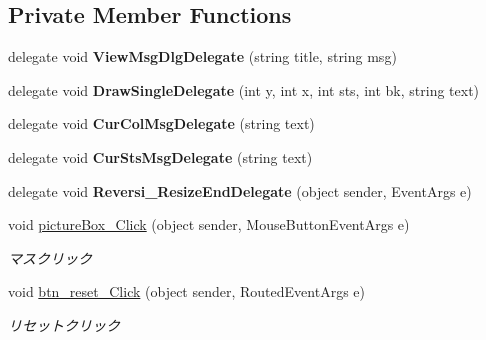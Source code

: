 \subsection*{Private Member Functions}
\begin{DoxyCompactItemize}
\item 
\mbox{\label{class_reversi4color_wpf_1_1_main_window_af7a6383c09300a4e2171b6eea4e21612}} 
delegate void {\bfseries View\+Msg\+Dlg\+Delegate} (string title, string msg)
\item 
\mbox{\label{class_reversi4color_wpf_1_1_main_window_ad205bd924bfb935dea867930734f6df7}} 
delegate void {\bfseries Draw\+Single\+Delegate} (int y, int x, int sts, int bk, string text)
\item 
\mbox{\label{class_reversi4color_wpf_1_1_main_window_a5733a1e142e99fd7fbf2697fb391501e}} 
delegate void {\bfseries Cur\+Col\+Msg\+Delegate} (string text)
\item 
\mbox{\label{class_reversi4color_wpf_1_1_main_window_afb1b39c06d2e3ffca18b9c026fe5c88b}} 
delegate void {\bfseries Cur\+Sts\+Msg\+Delegate} (string text)
\item 
\mbox{\label{class_reversi4color_wpf_1_1_main_window_a0e60e98e70f61ee056f56011ef6d2694}} 
delegate void {\bfseries Reversi\+\_\+\+Resize\+End\+Delegate} (object sender, Event\+Args e)
\item 
void \hyperlink{class_reversi4color_wpf_1_1_main_window_abdd178ee605694145f7d214870176c07}{picture\+Box\+\_\+\+Click} (object sender, Mouse\+Button\+Event\+Args e)
\begin{DoxyCompactList}\small\item\em マスクリック \end{DoxyCompactList}\item 
void \hyperlink{class_reversi4color_wpf_1_1_main_window_a0ac7673de0ecfc247dd3224a9f999098}{btn\+\_\+reset\+\_\+\+Click} (object sender, Routed\+Event\+Args e)
\begin{DoxyCompactList}\small\item\em リセットクリック \end{DoxyCompactList}\item 

\end{DoxyCompactItemize}
